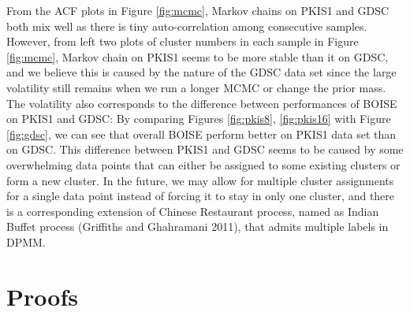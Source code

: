 \documentclass[12pt]{article}
\begin{document}
From the ACF plots in Figure \ref{fig:mcmc}, Markov chains on PKIS1 and GDSC both mix well as there is tiny auto-correlation among consecutive samples. However, from left two plots of cluster numbers in each sample in Figure \ref{fig:mcmc}, Markov chain on PKIS1 seems to be more stable than it on GDSC, and we believe this is caused by the nature of the GDSC data set since the large volatility still remains when we run a longer MCMC or change the prior mass. The volatility also corresponds to the difference between performances of BOISE on PKIS1 and GDSC: By comparing Figures  \ref{fig:pkis8}, \ref{fig:pkis16} with Figure \ref{fig:gdsc}, we can see that overall BOISE perform better on PKIS1 data set than on GDSC. This difference between PKIS1 and GDSC seems to be caused by some overwhelming data points that can either be assigned to some existing clusters or form a new cluster. In the future, we may allow for multiple cluster assignments for a single data point instead of forcing it to stay in only one cluster, and there is a corresponding extension of Chinese Restaurant process, named as Indian Buffet process (Griffiths and Ghahramani 2011), that admits multiple labels in DPMM. 

%
%

\appendix 

\section{Proofs}
\end{document}
